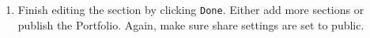 \documentclass{article}
\begin{document}
\begin{enumerate}
    \item 
    Finish editing the section by clicking \verb|Done|.
    Either add more sections or publish the Portfolio.
    Again, make sure share settings are set to public. 


\end{enumerate}




\end{document}
